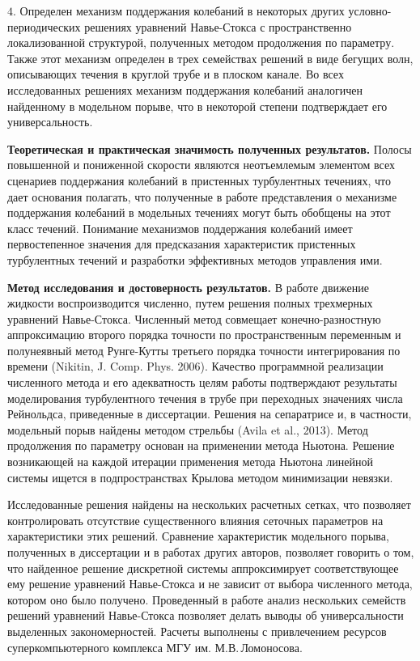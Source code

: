 \noindent $4.$ Определен механизм поддержания колебаний в некоторых других условно-периодических решениях уравнений Навье-Стокса с пространственно локализованной структурой, полученных методом продолжения по параметру. Также этот механизм определен в трех семействах решений в виде бегущих волн, описывающих течения в круглой трубе и в плоском канале. Во всех исследованных решениях механизм поддержания колебаний аналогичен найденному в модельном порыве, что в некоторой степени подтверждает его универсальность. 

{\bf Теоретическая и практическая значимость полученных результатов.}
Полосы повышенной и пониженной скорости являются неотъемлемым элементом всех сценариев поддержания колебаний в пристенных турбулентных течениях, что дает основания полагать, что полученные в работе представления о механизме поддержания колебаний в модельных течениях могут быть обобщены на этот класс течений. Понимание механизмов поддержания колебаний имеет первостепенное значения для предсказания характеристик пристенных турбулентных течений и разработки эффективных методов управления ими.

\textbf{Метод исследования и достоверность результатов.}
В работе движение жидкости воспроизводится численно, путем решения полных трехмерных уравнений Навье-Стокса. Численный метод совмещает конечно-разностную аппроксимацию второго порядка точности по пространственным переменным и полунеявный метод Рунге-Кутты третьего порядка точности интегрирования по времени (Nikitin, J. Comp. Phys. 2006). Качество программной реализации численного метода и его адекватность целям работы подтверждают результаты моделирования турбулентного течения в трубе при переходных значениях числа Рейнольдса, приведенные в диссертации. Решения на сепаратрисе и, в частности, модельный порыв найдены методом стрельбы (Avila et al., 2013). Метод продолжения по параметру основан на применении метода Ньютона. Решение возникающей на каждой итерации применения метода Ньютона линейной системы ищется в подпространствах Крылова методом минимизации невязки.

Исследованные решения найдены на нескольких расчетных сетках, что позволяет контролировать отсутствие существенного влияния сеточных параметров на характеристики этих решений. Сравнение характеристик модельного порыва, полученных в диссертации и в работах других авторов, позволяет говорить о том, что найденное решение дискретной системы аппроксимирует соответствующее ему решение уравнений Навье-Стокса и не зависит от выбора численного метода, котором оно было получено. Проведенный в работе анализ нескольких семейств решений уравнений Навье-Стокса позволяет делать выводы об универсальности выделенных закономерностей. Расчеты выполнены с привлечением ресурсов суперкомпьютерного комплекса МГУ им. М.В.\,Ломоносова.

